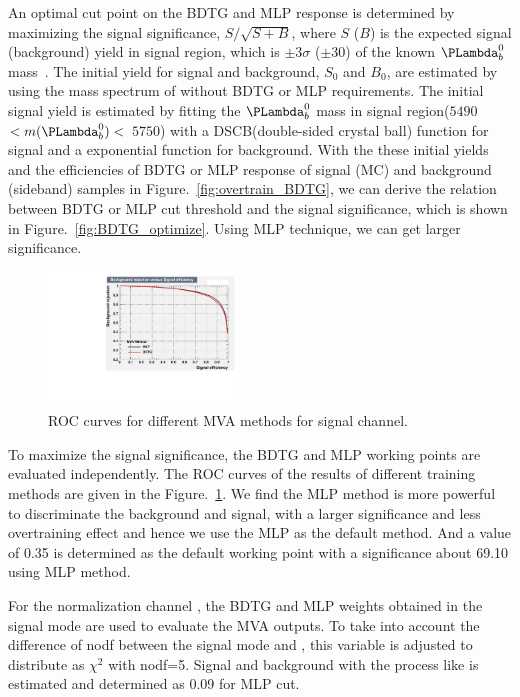 An optimal cut point on the BDTG and MLP response is determined by maximizing the signal significance, $S/\sqrt{S+B}$, 
where $S$ ($B$) is the expected signal (background) yield in signal region, 
which is $\pm3\sigma$ ($\pm30$\mev) of the known $\Lb$ mass~\cite{PDG}. 
The initial yield for signal and background, $S_0$ and $B_0$, 
are estimated by using the mass spectrum of \Lb without BDTG or MLP requirements. 
The initial signal yield is estimated by fitting the $\Lb$ mass in signal region($5490$ \mevcc $<m(\Lb)<$ $5750$) 
with a DSCB(double-sided crystal ball) function for signal and a exponential function for background. 
With the these initial yields and the efficiencies of BDTG or MLP response of signal (MC) and background (sideband) samples in Figure.~\ref{fig:overtrain_BDTG},
we can derive the relation between BDTG or MLP cut threshold and the signal significance, 
which is shown in Figure.~\ref{fig:BDTG_optimize}. 
Using MLP technique, we can get larger significance.

\begin{figure}[!bth]
\centering
\includegraphics[width=0.45\textwidth]{Figures/05_open_charm/02_selection/rejBvsS.pdf}%
\caption{ROC curves for different MVA methods for signal channel.}
\label{fig:ROC}
\end{figure}

To maximize the signal significance, 
the BDTG and MLP working points are evaluated independently. 
The ROC curves of the results of different training methods are given in the Figure.~\ref{fig:ROC}. 
We find the MLP method is more powerful to discriminate the background and signal, 
with a larger significance and less overtraining effect and hence we use the MLP as the default method. 
And a value of 0.35 is determined as the default working point with a significance about 69.10 using MLP method. 

For the normalization channel \LbLcDs, 
the BDTG and MLP weights obtained in the signal mode are used to evaluate the MVA outputs. 
To take into account the difference of nodf between the signal mode and \LbLcDs, 
this variable is adjusted to distribute as $\chi^2$ with nodf=5. 
Signal and background with the process like \LbLckkpi is estimated and determined as 0.09 for MLP cut. 

